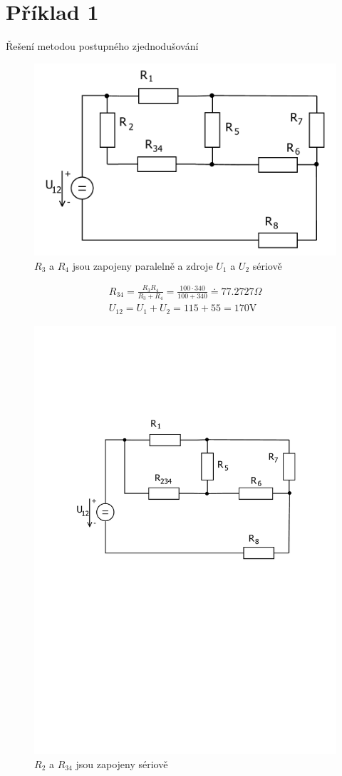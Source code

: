 \section{Příklad 1}
	{
	\Large Řešení metodou postupného zjednodušování}\\

	\begin{figure}[H]
		\center\includegraphics[width=0.6\linewidth]{obr/1_2}
		\caption{$R_3$ a $R_4$ jsou zapojeny paralelně a zdroje $U_1$ a $U_2$ sériově }
	\end{figure}
	\begin{gather*}
		R_{34} = \frac{R_3 R_4}{R_3 + R_4} =\frac{100 \cdot 340}{100 + 340} \doteq 77.2727 \Omega \\
		U_{12} = {U_1 + U_2} = {115 + 55} = 170  \text{V}
	\end{gather*}
	\begin{figure}[H]
		\center\includegraphics[width=0.6\linewidth]{obr/1_3}
		\caption{$R_2$ a $R_{34}$ jsou zapojeny sériově}
	\end{figure}
